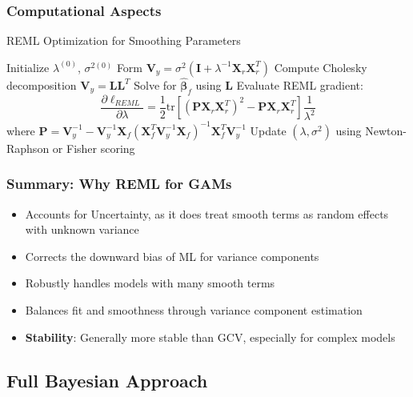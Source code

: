 \documentclass[12pt]{article}
\begin{document}
\subsubsection{Computational Aspects}

\begin{algorithm}
\caption{REML Optimization for Smoothing Parameters}
\begin{algorithmic}[1]
\State Initialize $\lambda^{(0)}$, $\sigma^{2(0)}$
\Repeat
    \State Form $\mathbf{V}_y = \sigma^2(\mathbf{I} + \lambda^{-1}\mathbf{X}_r\mathbf{X}_r^T)$
    \State Compute Cholesky decomposition $\mathbf{V}_y = \mathbf{L}\mathbf{L}^T$
    \State Solve for $\hat{\bm{\beta}}_f$ using $\mathbf{L}$
    \State Evaluate REML gradient:
    \begin{equation}
    \frac{\partial \ell_{REML}}{\partial \lambda} = \frac{1}{2}\text{tr}\left[(\mathbf{P}\mathbf{X}_r\mathbf{X}_r^T)^2 - \mathbf{P}\mathbf{X}_r\mathbf{X}_r^T\right]\frac{1}{\lambda^2}
    \end{equation}
    where $\mathbf{P} = \mathbf{V}_y^{-1} - \mathbf{V}_y^{-1}\mathbf{X}_f(\mathbf{X}_f^T\mathbf{V}_y^{-1}\mathbf{X}_f)^{-1}\mathbf{X}_f^T\mathbf{V}_y^{-1}$
    \State Update $(\lambda, \sigma^2)$ using Newton-Raphson or Fisher scoring
\end{algorithmic}
\end{algorithm}

\subsubsection{Summary: Why REML for GAMs}

\begin{itemize}
    \item Accounts for Uncertainty, as it does treat smooth terms as random effects with unknown variance
    \item Corrects the downward bias of ML for variance components
    \item Robustly handles models with many smooth terms
    \item Balances fit and smoothness through variance component estimation
    \item \textbf{Stability}: Generally more stable than GCV, especially for complex models
\end{itemize}



\subsection{Full Bayesian Approach}
\end{document}
